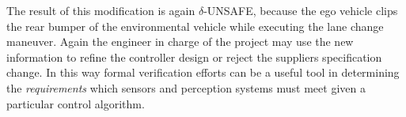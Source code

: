 The result of this modification is again $\delta$-UNSAFE, because the ego vehicle clips the rear bumper of the environmental vehicle while executing the lane change maneuver. Again the engineer in charge of the project may use the new information to refine the controller design or reject the suppliers specification change. In this way formal verification efforts can be a useful tool in determining the \emph{requirements} which sensors and perception systems must meet given a particular control algorithm. 


	
